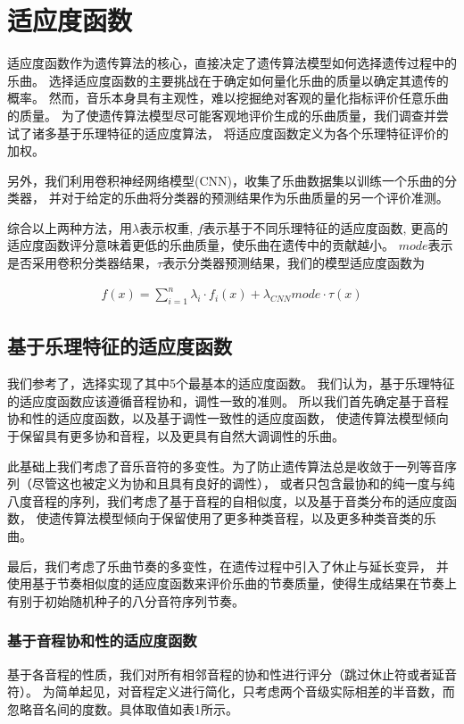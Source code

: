 \documentclass{article}
\begin{document}
\section{适应度函数}
适应度函数作为遗传算法的核心，直接决定了遗传算法模型如何选择遗传过程中的乐曲。
选择适应度函数的主要挑战在于确定如何量化乐曲的质量以确定其遗传的概率。
然而，音乐本身具有主观性，难以挖掘绝对客观的量化指标评价任意乐曲的质量。
为了使遗传算法模型尽可能客观地评价生成的乐曲质量，我们调查并尝试了诸多基于乐理特征的适应度算法，
将适应度函数定义为各个乐理特征评价的加权。

另外，我们利用卷积神经网络模型(CNN)，收集了乐曲数据集以训练一个乐曲的分类器，
并对于给定的乐曲将分类器的预测结果作为乐曲质量的另一个评价准测。

综合以上两种方法，用$\lambda$表示权重, $f$表示基于不同乐理特征的适应度函数,
更高的适应度函数评分意味着更低的乐曲质量，使乐曲在遗传中的贡献越小。
$mode$表示是否采用卷积分类器结果，$\tau$表示分类器预测结果，我们的模型适应度函数为

\begin{align}
    f(x)=\sum_{i=1}^{n} \lambda_i \cdot f_i(x) + \lambda_{CNN} mode \cdot \tau(x)
\end{align}


\subsection{基于乐理特征的适应度函数}
我们参考了\cite{article1}\cite{article2}，选择实现了其中5个最基本的适应度函数。
我们认为，基于乐理特征的适应度函数应该遵循音程协和，调性一致的准则。
所以我们首先确定基于音程协和性的适应度函数，以及基于调性一致性的适应度函数，
使遗传算法模型倾向于保留具有更多协和音程，以及更具有自然大调调性的乐曲。

此基础上我们考虑了音乐音符的多变性。为了防止遗传算法总是收敛于一列等音序列（尽管这也被定义为协和且具有良好的调性），
或者只包含最协和的纯一度与纯八度音程的序列，我们考虑了基于音程的自相似度，以及基于音类分布的适应度函数，
使遗传算法模型倾向于保留使用了更多种类音程，以及更多种类音类的乐曲。

最后，我们考虑了乐曲节奏的多变性，在遗传过程中引入了休止与延长变异，
并使用基于节奏相似度的适应度函数来评价乐曲的节奏质量，使得生成结果在节奏上有别于初始随机种子的八分音符序列节奏。

\subsubsection{基于音程协和性的适应度函数}
基于各音程的性质，我们对所有相邻音程的协和性进行评分（跳过休止符或者延音符）。
为简单起见，对音程定义进行简化，只考虑两个音级实际相差的半音数，而忽略音名间的度数。具体取值如表1所示。
\end{document}
